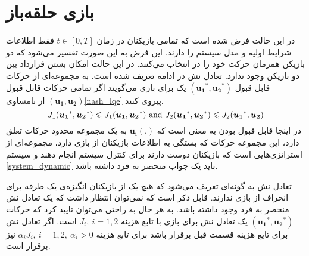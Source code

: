 \section{بازی حلقه‌باز}
در این حالت فرض شده است که تمامی بازیکنان در زمان 
$t \in [0, T]$
فقط اطلاعات شرایط اولیه و مدل سیستم را دارند. این فرض به این صورت تفسیر می‌شود که دو بازیکن همزمان حرکت خود را در انتخاب می‌کنند. در این حالت امکان بستن قرارداد بین دو بازیکن وجود ندارد. تعادل نش در ادامه تعریف شده ‌است.
به مجموعه‌ای از حرکات قابل قبول 
$(\boldsymbol{u_1}^*,  \boldsymbol{u_2}^*)$
یک  برای بازی می‌گویند اگر تمامی حرکات قابل قبول 
$(\boldsymbol{u_1},  \boldsymbol{u_2})$
از نامساوی\ref{nash_lqe} پیروی کنند.
\begin{equation}\label{nash_lqe}
	J_1(\boldsymbol{u_1}^*, \boldsymbol{u_2}^*)\leq J_1(\boldsymbol{u_1}, \boldsymbol{u_2}^*) \text{\rm{ and }}
	J_2(\boldsymbol{u_1}^*, \boldsymbol{u_2}^*)\leq 
	J_2(\boldsymbol{u_1}^*, \boldsymbol{u_2})
\end{equation}
در اینجا قابل قبول بودن به معنی است که
$\boldsymbol{u_i}(.)$
به یک مجموعه محدود حرکات تعلق دارد، این مجموعه حرکات که بستگی به اطلاعات بازیکنان از بازی دارد، مجموعه‌ای از استراتژی‌هایی است که بازیکنان دوست دارند برای کنترل سیستم انجام دهند و سیستم 
\ref{system_dynamic}
باید یک جواب منحصر به فرد داشته باشد. 


تعادل نش به گونه‌ای تعریف می‌شود که هیچ یک از بازیکنان انگیزه‌ی یک طرفه برای انحراف از بازی ندارند. قابل ذکر است که نمی‌توان انتظار داشت که یک تعادل نش منحصر به فرد وجود داشته باشد. به هر حال به راحتی می‌توان تایید کرد که حرکات
$(\boldsymbol{u_1}^*, \boldsymbol{u_2}^*)$
یک تعادل نش برای بازی با تابع هزینه
$J_i,~ i = 1, 2$
است. اگر تعادل نش برای تابع هزینه قسمت قبل برقرار باشد برای تابع هزینه
$\alpha_iJ_i,~ i = 1, 2, ~\alpha_i>0$
نیز برقرار است.



